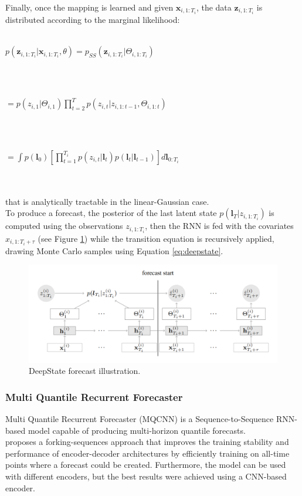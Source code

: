 \documentclass[a4paper, 12pt]{article} %
\begin{document}
	Finally, once the mapping is learned and given $\pmb{x}_{i, 1:T_i}$, the data $\pmb{z}_{i,1:T_i}$ is distributed according to the marginal likelihood:\\\\
	\centerline{
		$
		p(\pmb{z}_{i, 1:T_i} | \pmb{x}_{i, 1:T_i}, \theta)
		= p_{SS}(\pmb{z}_{i, 1:T_i} | \Theta_{i,1:T_i})
		$
	}\\\\
	\centerline{
		$
		= p(z_{i,1} | \Theta_{i,1}) \prod_{t=2}^{T}p(z_{i,t} | z_{i, 1:t-1}, \Theta_{i, 1:t})
		$
	}\\\\
	\centerline{
		$
		= \int p(\pmb{l}_0) [\prod_{t=1}^{T_i} p(z_{i,t} | \pmb{l}_t)p(\pmb{l}_t | \pmb{l}_{t-1})] d\pmb{l}_{0:T_i}
		$
	}\\\\
	that is analytically tractable in the linear-Gaussian case.\\
	To produce a forecast, the posterior of the last latent state $p(\pmb{l}_T | z_{i, 1:T_i})$ is computed using the observations $z_{i, 1:T_i}$, then the RNN is fed with the covariates $x_{i, 1:T_i+\tau}$ (see Figure \ref{fig:deepstate2}) while the transition equation is recursively applied, drawing Monte Carlo samples using Equation \ref{eq:deepstate}.
	\begin{figure}
		\includegraphics[width=\linewidth]{img/deepstate2.png}
		\caption{DeepState forecast illustration.}
		\label{fig:deepstate2}
	\end{figure}
	
	\subsubsection{Multi Quantile Recurrent Forecaster } \label{sssec:mqcnn}
	Multi Quantile Recurrent Forecaster (MQCNN) \cite{MQCNN} is a Sequence-to-Sequence RNN-based model capable of producing multi-horizon quantile forecasts.\\
	\cite{MQCNN} proposes a forking-sequences approach that improves the training stability and performance of encoder-decoder architectures by efficiently training on all-time points where a forecast could be created. Furthermore, the model can be used with different encoders, but the best results were achieved using a CNN-based encoder.
	
\end{document}
